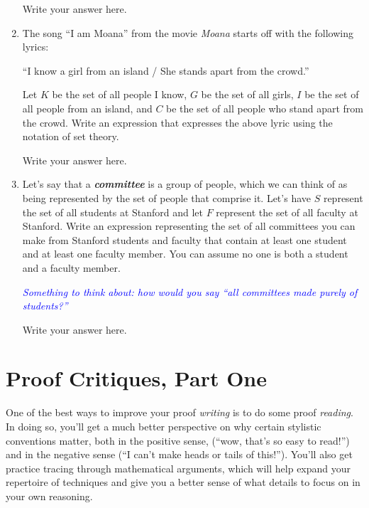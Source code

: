 \documentclass{article}
\renewcommand{\(}{\left(}
\renewcommand{\)}{\right)}
\theoremstyle{plain}
\theoremstyle{plain}
\theoremstyle{definition}
\begin{document}
\begin{enumerate}[label*=\roman*.,ref=\roman*]
\begin{shaded}
Write your answer here.
\end{shaded}

\item The song ``I am Moana'' from the movie \textit{Moana} starts off with the following lyrics: 
\begin{center}
    ``I know a girl from an island / She stands apart from the crowd.''
\end{center}
Let $K$ be the set of all people I know, $G$ be the set of all girls, $I$ be the set of all people from an island, and $C$ be the set of all people who stand apart from the crowd. Write an expression that expresses the above lyric using the notation of set theory. 

\begin{shaded}
Write your answer here.
\end{shaded}

\item Let's say that a \textit{\textbf{committee}} is a group of people, which we can think of as being represented by the set of people that comprise it. Let's have $S$ represent the set of all students at Stanford and let $F$ represent the set of all faculty at Stanford. Write an expression representing the set of all committees you can make from Stanford students and faculty that contain at least one student and at least one faculty member. You can assume no one is both a student and a faculty member.

\textit{\textcolor{blue}{Something to think about: how would you say ``all committees made purely of students?'' }}

\begin{shaded}
Write your answer here.
\end{shaded}

\end{enumerate}

\section{Proof Critiques, Part One}

One of the best ways to improve your proof \textit{writing} is to do some proof \textit{reading}. In doing so, you'll get a much better perspective on why certain stylistic conventions matter, both in the positive sense, (``wow, that's so easy to read!'') and in the negative sense (``I can't make heads or tails of this!''). You'll also get practice tracing through mathematical arguments, which will help expand your repertoire of techniques and give you a better sense of what details to focus on in your own reasoning. 
\end{document}
